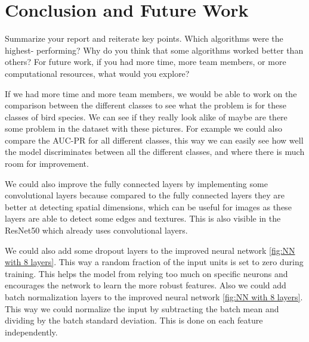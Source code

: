 \section{Conclusion and Future Work}
Summarize your report and reiterate key points. Which algorithms were the highest- performing? Why do you think that some algorithms worked better than others? For future work, if you had more time, more team members, or more computational resources, what would you explore?

If we had more time and more team members, we would be able to work on the comparison between the different classes to see what the problem is for these classes of bird species. We can see if they really look alike of maybe are there some problem in the dataset with these pictures. For example we could also compare the AUC-PR for all different classes, this way we can easily see how well the model discriminates between all the different classes, and where there is much room for improvement. 

We could also improve the fully connected layers by implementing some convolutional layers because compared to the fully connected layers they are better at detecting spatial dimensions, which can be useful for images as these layers are able to detect some edges and textures. This is also visible in the ResNet50 which already uses convolutional layers. 

We could also add some dropout layers to the improved neural network \ref{fig:NN with 8 layers}. This way a random fraction of the input units is set to zero during training. This helps the model from relying too much on specific neurons and encourages the network to learn the more robust features. Also we could add batch normalization layers to the improved neural network \ref{fig:NN with 8 layers}. This way we could normalize the input by subtracting the batch mean and dividing by the batch standard deviation. This is done on each feature independently. 